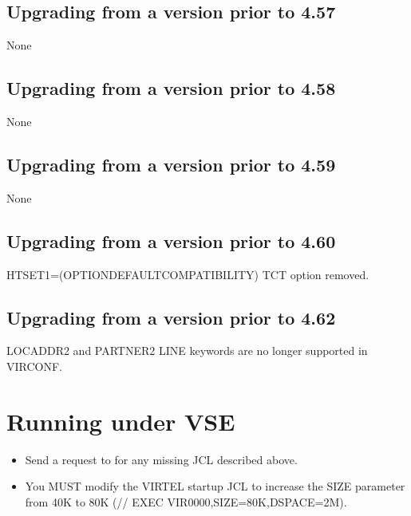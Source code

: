 \documentclass[letterpaper,10pt,english]{sphinxmanual}
\begin{document}
\ignorespaces 

\section{Upgrading from a version prior to 4.57}
\label{\detokenize{Migration_Guide:upgrading-from-a-version-prior-to-4-57}}\label{\detokenize{Migration_Guide:index-7}}
\sphinxAtStartPar
None


\section{Upgrading from a version prior to 4.58}
\label{\detokenize{Migration_Guide:upgrading-from-a-version-prior-to-4-58}}
\sphinxAtStartPar
None


\section{Upgrading from a version prior to 4.59}
\label{\detokenize{Migration_Guide:upgrading-from-a-version-prior-to-4-59}}
\sphinxAtStartPar
None


\section{Upgrading from a version prior to 4.60}
\label{\detokenize{Migration_Guide:upgrading-from-a-version-prior-to-4-60}}
\sphinxAtStartPar
HTSET1=(OPTION\sphinxhyphen{}DEFAULT\sphinxhyphen{}COMPATIBILITY) TCT option removed.


\section{Upgrading from a version prior to 4.62}
\label{\detokenize{Migration_Guide:upgrading-from-a-version-prior-to-4-62}}
\sphinxAtStartPar
LOCADDR2 and PARTNER2 LINE keywords are no longer supported in VIRCONF.

\newpage

\ignorespaces 

\chapter{Running under VSE}
\label{\detokenize{Migration_Guide:running-under-vse}}\label{\detokenize{Migration_Guide:index-8}}\begin{itemize}
\item {} 
\sphinxAtStartPar
Send a request to  for any missing JCL described above.

\item {} 
\sphinxAtStartPar
You MUST modify the VIRTEL startup JCL to increase the SIZE parameter from 40K to 80K (// EXEC VIR0000,SIZE=80K,DSPACE=2M).

\end{itemize}
\end{document}
